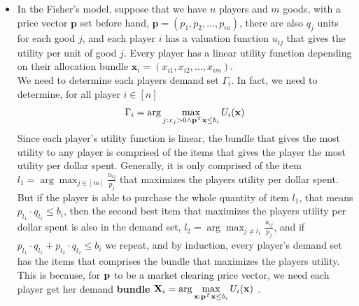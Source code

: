 \documentclass[12pt]{article}
\newcommand \bld[1]{\boldsymbol{#1}}
\begin{document}
\begin{itemize}
\begin{itemize}
	\end{itemize}
	\item[2.]
	In the Fisher's model, suppose that we have $n$ players and $m$ goods, with a price vector $\bld{p}$ set before hand, $\bld{p} = (p_1,p_2,\ldots,p_m)$, there are also $q_j$ units for each good $j$, and each player $i$ has a valuation function $u_{ij}$ that gives the utility per unit of good $j$. Every player has a linear utility function depending on their allocation bundle $\bld{x}_i = (x_{i1},x_{i2},\ldots,x_{im})$.\\
		We need to determine each players demand set $\Gamma_i$. In fact, we need to determine, for all player $i \in [n]$
		\[
			\Gamma_i = \displaystyle \arg \max\limits_{j : x_j > 0 \land \bold{p}^T \bold{x} \leq b_i} U_i(\bold{x}) 
		\]
		 Since each player's utility function is linear, the bundle that gives the most utility to any player is comprised of the items that gives the player the most utility per dollar spent. Generally, it is only comprised of the item $l_1 = \arg \max_{j \in [m]} \frac{u_{ij}}{p_j}$ that maximizes the players utility per dollar spent. But if the player is able to purchase the whole quantity of item $l_1$, that means $p_{l_1} \cdot q_{l_1} \leq b_i$, then the second best item that maximizes the players utility per dollar spent is also in the demand set, $l_2 = \arg \max_{j \neq l_1} \frac{u_{ij}}{p_j}$, and if $p_{l_1} \cdot q_{l_1} + p_{l_2} \cdot q_{l_2} \leq b_i$ we repeat, and by induction, every player's demand set has the items that comprises the bundle that maximizes the players utility. 
		 \\ This is because, for $\bold{p}$ to be a market clearing price vector, we need each player get her demand \textbf{bundle} $\displaystyle \bold{X}_i = \arg \max_{\bold{x} : \bold{p}^T \bold{x} \leq b_i} U_i(\bold{x})$ . 
		 

\end{itemize}
\end{document}
